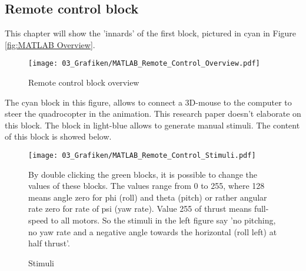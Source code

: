 \subsection{Remote control block}\label{chapter_REMOTE_CONTROL_BLOCK}
This chapter will show the 'innards' of the first block, pictured in cyan in Figure \ref{fig:MATLAB Overview}.
\begin{figure}[H]
	\centering
		\texttt{[image: 03\_Grafiken/MATLAB\_Remote\_Control\_Overview.pdf]}
	\caption{Remote control block overview}
	\label{fig:Remote control block}
\end{figure}
The cyan block in this figure, allows to connect a 3D-mouse to the computer to steer the quadrocopter in the animation. This research paper doesn't elaborate on this block.
The block in light-blue allows to generate manual stimuli. The content of this block is showed below.
\begin{figure}[htbp]
	\begin{minipage}[t]{6cm}
		\vspace{0pt}
		\centering
		\texttt{[image: 03\_Grafiken/MATLAB\_Remote\_Control\_Stimuli.pdf]}
		\caption{Stimuli}
		\label{fig:Remote control stimuli}
	\end{minipage}
	\hfill
	\begin{minipage}[t]{8cm}
		\vspace{0pt}
		\medskip
		\begin{onehalfspace}
		By double clicking the green blocks, it is possible to change the values of these blocks. The values range 		 
		from 0 to 255, where 128 means angle zero for phi (roll) and theta (pitch) or rather angular rate zero for 			rate of psi (yaw rate). Value 255 of thrust means 				
		full-speed to all motors.
		So the stimuli in the left figure say 'no pitching, no yaw rate and a negative angle towards the horizontal 	
		(roll left) at half thrust'.
		\end{onehalfspace}
	\end{minipage}
\end{figure}